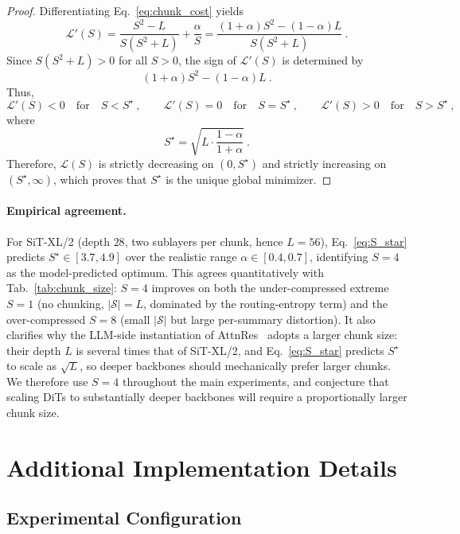 \documentclass{llmxive}
\begin{document}
\begin{proof}
Differentiating Eq.~\eqref{eq:chunk_cost} yields
\[
\mathcal{L}'(S)
=
\frac{S^2 - L}{S(S^2 + L)}
+
\frac{\alpha}{S}
=
\frac{(1+\alpha)S^2-(1-\alpha)L}{S(S^2+L)} \ .
\]
Since $S(S^2+L)>0$ for all $S>0$, the sign of $\mathcal{L}'(S)$ is determined by
\[
(1+\alpha)S^2-(1-\alpha)L \ .
\]
Thus,
\[
\mathcal{L}'(S)<0 \quad \text{for} \quad S<S^\star \ ,
\qquad
\mathcal{L}'(S)=0 \quad \text{for} \quad S=S^\star \ ,
\qquad
\mathcal{L}'(S)>0 \quad \text{for} \quad S>S^\star \ ,
\]
where
\[
S^\star=\sqrt{L \cdot \frac{1-\alpha}{1+\alpha}} \ .
\]
Therefore, $\mathcal{L}(S)$ is strictly decreasing on $(0,S^\star)$ and strictly
increasing on $(S^\star,\infty)$, which proves that $S^\star$ is the unique
global minimizer.
\end{proof}

\paragraph{Empirical agreement.}
For SiT-XL/2 (depth $28$, two sublayers per chunk, hence $L = 56$), Eq.~\eqref{eq:S_star} predicts $S^\star \in [3.7, 4.9]$ over the realistic range $\alpha \in [0.4, 0.7]$, identifying $S = 4$ as the model-predicted optimum. This agrees quantitatively with Tab.~\ref{tab:chunk_size}: $S = 4$ improves on both the under-compressed extreme $S = 1$ (no chunking, $|\mathcal{S}| = L$, dominated by the routing-entropy term) and the over-compressed $S = 8$ (small $|\mathcal{S}|$ but large per-summary distortion). It also clarifies why the LLM-side instantiation of AttnRes~\citep{team2026attention} adopts a larger chunk size: their depth $L$ is several times that of SiT-XL/2, and Eq.~\eqref{eq:S_star} predicts $S^\star$ to scale as $\sqrt{L}$, so deeper backbones should mechanically prefer larger chunks. We therefore use $S = 4$ throughout the main experiments, and conjecture that scaling DiTs to substantially deeper backbones will require a proportionally larger chunk size.


\section{Additional Implementation Details}
\label{impl}

\subsection{Experimental Configuration}
\end{document}
